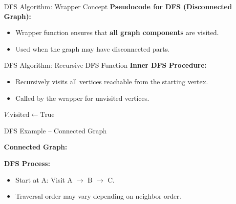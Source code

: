 \documentclass{beamer}
\begin{document}
\begin{frame}{DFS Algorithm: Wrapper Concept}
    \textbf{Pseudocode for DFS (Disconnected Graph):}
    \begin{itemize}
        \item Wrapper function ensures that \textbf{all graph components} are visited.
        \item Used when the graph may have disconnected parts.
    \end{itemize}

    \begin{algorithmic}[1]
                    \State {}
                \EndIf
            \EndFor
        \EndProcedure
    \end{algorithmic}
\end{frame}

\begin{frame}{DFS Algorithm: Recursive DFS Function}
    \textbf{Inner DFS Procedure:}
    \begin{itemize}
        \item Recursively visits all vertices reachable from the starting vertex.
        \item Called by the wrapper for unvisited vertices.
    \end{itemize}

    \begin{algorithmic}[1]
            \State \( V.\text{visited} \gets \text{True} \)
                    \State {}
                \EndIf
            \EndFor
        \EndProcedure
    \end{algorithmic}
\end{frame}

\begin{frame}{DFS Example – Connected Graph}

    \textbf{Connected Graph:}

    \begin{center}
    \end{center}

    \vspace{1em}
    \textbf{DFS Process:}
    \begin{itemize}
        \item Start at A: Visit A $\rightarrow$ B $\rightarrow$ C.
        \item Traversal order may vary depending on neighbor order.
    \end{itemize}
\end{frame}
\end{document}
